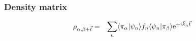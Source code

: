 \documentclass[11pt,a4paper]{report}
\begin{document}
\subsubsection{Density matrix}
\begin{eqnarray}
\rho_{\alpha,\beta+\vec{t}}
&=&
\sum_n \langle\pi_\alpha|\psi_n\rangle f_n
\langle\psi_n|\pi_\beta\rangle
\mathrm{e}^{+i\vec{k}_n\vec{t}}
\end{eqnarray}


\clearpage
 
\end{document}
